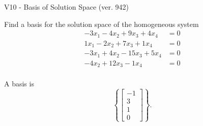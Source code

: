 \begin{exercise}
  \begin{exerciseTitle}V10 - Basis of Solution Space (ver. 942)\end{exerciseTitle}
  \begin{exerciseStatement}
    Find a basis for the solution space of the homogeneous system 
\begin{align*}
 -3 x_ 1 -4 x_ 2 + 9 x_ 3 + 4 x_ 4 &= 0  \\ 
  1 x_ 1 -2 x_ 2 + 7 x_ 3 + 1 x_ 4 &= 0  \\ 
  -3 x_ 1 + 4 x_ 2 -15 x_ 3 + 5 x_ 4 &= 0  \\ 
  -4 x_ 2 + 12 x_ 3 -1 x_ 4 &= 0  \\ 
 \end{align*}


 
  \end{exerciseStatement}

  \begin{exerciseAnswer}
   A basis is   
\[\left\{\left[\begin{array}{c}
-1 \\
3 \\
1 \\
0
\end{array}\right]\right\}.\]

  


  \end{exerciseAnswer}
\end{exercise}